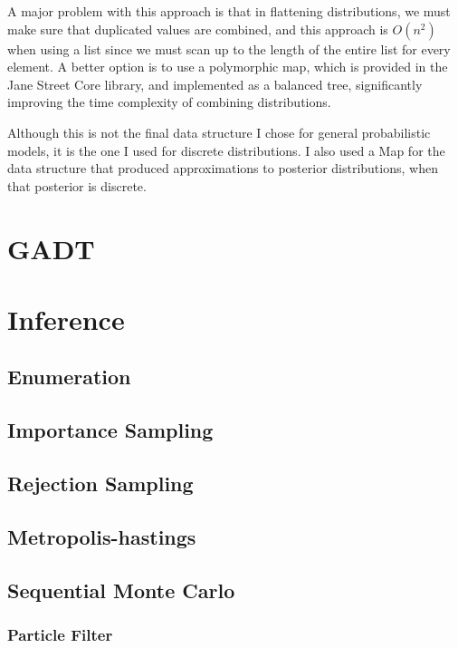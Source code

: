 

A major problem with this approach is that in flattening distributions, we must make sure that duplicated values are combined, and this approach is $O(n^2)$ when using a list since we must scan up to the length of the entire list for every element. A better option is to use a polymorphic map, which is provided in the Jane Street Core library, and implemented as a balanced tree, significantly improving the time complexity of combining distributions.



Although this is not the final data structure I chose for general probabilistic models, it is the one I used for discrete distributions. I also used a Map for the data structure that produced approximations to posterior distributions, when that posterior is discrete.

\section{GADT}

\section{Inference}

\subsection{Enumeration}
\subsection{Importance Sampling}
\subsection{Rejection Sampling}
\subsection{Metropolis-hastings}
\subsection{Sequential Monte Carlo}
\subsubsection{Particle Filter}
